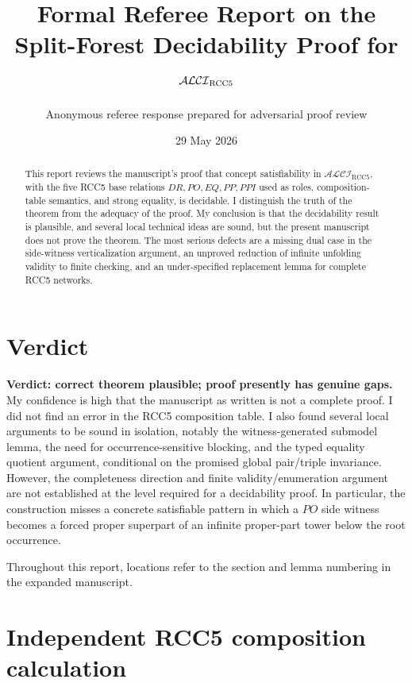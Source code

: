\documentclass[11pt]{article}
\title{Formal Referee Report on the Split-Forest Decidability Proof for $\ALCI_{\RCC}$}
\author{Anonymous referee response prepared for adversarial proof review}
\date{29 May 2026}
\newcommand{\ALCI}{\mathcal{ALCI}}
\newcommand{\RCC}{\mathrm{RCC5}}
\begin{document}
\maketitle

\begin{abstract}
This report reviews the manuscript's proof that concept satisfiability in $\ALCI_{\RCC}$, with the five RCC5 base relations $DR,PO,EQ,PP,PPI$ used as roles, composition-table semantics, and strong equality, is decidable. I distinguish the truth of the theorem from the adequacy of the proof. My conclusion is that the decidability result is plausible, and several local technical ideas are sound, but the present manuscript does not prove the theorem. The most serious defects are a missing dual case in the side-witness verticalization argument, an unproved reduction of infinite unfolding validity to finite checking, and an under-specified replacement lemma for complete RCC5 networks.
\end{abstract}

\section{Verdict}

\textbf{Verdict: correct theorem plausible; proof presently has genuine gaps.} My confidence is high that the manuscript as written is not a complete proof. I did not find an error in the RCC5 composition table. I also found several local arguments to be sound in isolation, notably the witness-generated submodel lemma, the need for occurrence-sensitive blocking, and the typed equality quotient argument, conditional on the promised global pair/triple invariance. However, the completeness direction and finite validity/enumeration argument are not established at the level required for a decidability proof. In particular, the construction misses a concrete satisfiable pattern in which a $PO$ side witness becomes a forced proper superpart of an infinite proper-part tower below the root occurrence.

Throughout this report, locations refer to the section and lemma numbering in the expanded manuscript.

\section{Independent RCC5 composition calculation}
\end{document}
